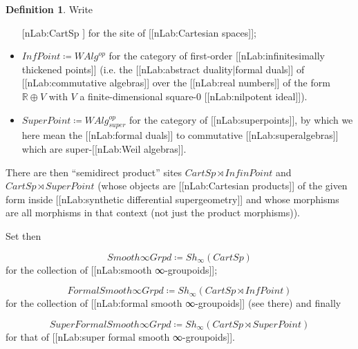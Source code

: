 \documentclass[12pt,titlepage]{article}
\theoremstyle{plain}
\theoremstyle{definition}
\newtheorem{defn}{Definition}
\theoremstyle{remark}
\begin{document}
\begin{defn}
\label{SupergeometricModel}\hypertarget{SupergeometricModel}{}
Write

\begin{itemize}%
\item [[nLab:CartSp]] for the site of [[nLab:Cartesian spaces]];


\item $InfPoint \coloneqq WAlg^{op}$ for the category of first-order [[nLab:infinitesimally thickened points]] (i.e. the [[nLab:abstract duality|formal duals]] of [[nLab:commutative algebras]] over the [[nLab:real numbers]] of the form $\mathbb{R}\oplus V$ with $V$ a finite-dimensional square-0 [[nLab:nilpotent ideal]]).


\item $SuperPoint \coloneqq WAlg_{super}^{op}$ for the category of [[nLab:superpoints]], by which we here mean the [[nLab:formal duals]] to commutative [[nLab:superalgebras]] which are super-[[nLab:Weil algebras]].



\end{itemize}
There are then ``semidirect product'' sites $CartSp \rtimes InfinPoint$ and $CartSp \rtimes SuperPoint$ (whose objects are [[nLab:Cartesian products]] of the given form inside [[nLab:synthetic differential supergeometry]] and whose morphisms are all morphisms in that context (not just the product morphisms)).

Set then

\begin{displaymath}
Smooth \infty Grpd \coloneqq Sh_\infty(CartSp)
\end{displaymath}
for the collection of [[nLab:smooth ∞-groupoids]];

\begin{displaymath}
FormalSmooth\infty Grpd \coloneqq Sh_\infty(CartSp \rtimes InfPoint)
\end{displaymath}
for the collection of [[nLab:formal smooth ∞-groupoids]] (see there) and finally

\begin{displaymath}
SuperFormalSmooth\infty Grpd \coloneqq Sh_\infty(CartSp \rtimes SuperPoint)
\end{displaymath}
for that of [[nLab:super formal smooth ∞-groupoids]].

\end{defn}
\end{document}
